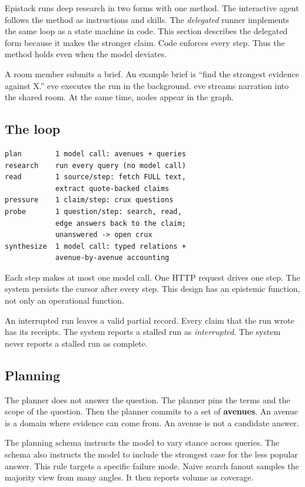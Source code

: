 \documentclass[10pt,twocolumn]{article}
\begin{document}
Epistack runs deep research in two forms with one method. The
interactive agent follows the method as instructions and skills. The
\emph{delegated} runner implements the same loop as a state machine in
code. This section describes the delegated form because it makes the
stronger claim. Code enforces every step. Thus the method holds even when
the model deviates.

A room member submits a brief. An example brief is ``find the strongest
evidence against X.'' eve executes the run in the background. eve streams
narration into the shared room. At the same time, nodes appear in the
graph.

\subsection{The loop}

\begin{lstlisting}
plan        1 model call: avenues + queries
research    run every query (no model call)
read        1 source/step: fetch FULL text,
            extract quote-backed claims
pressure    1 claim/step: crux questions
probe       1 question/step: search, read,
            edge answers back to the claim;
            unanswered -> open crux
synthesize  1 model call: typed relations +
            avenue-by-avenue accounting
\end{lstlisting}

Each step makes at most one model call. One HTTP request drives one step.
The system persists the cursor after every step. This design has an
epistemic function, not only an operational function.

An interrupted run leaves a valid partial record. Every claim that the
run wrote has its receipts. The system reports a stalled run as
\emph{interrupted}. The system never reports a stalled run as complete.

\subsection{Planning}

The planner does not answer the question. The planner pins the terms and
the scope of the question. Then the planner commits to a set of
\textbf{avenues}. An avenue is a domain where evidence can come from. An
avenue is not a candidate answer.

The planning schema instructs the model to vary stance across queries.
The schema also instructs the model to include the strongest case for the
less popular answer. This rule targets a specific failure mode. Naive
search fanout samples the majority view from many angles. It then reports
volume as coverage.
\end{document}
